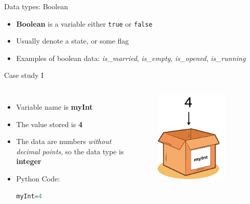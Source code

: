 \documentclass[10pt,xcolor={table,dvipsnames},t]{beamer}
\begin{document}
\begin{frame}{Data types: Boolean}
  \begin{itemize}
    \item \textbf{Boolean} is a variable either \texttt{true} or \texttt{false}
    \item Usually denote a state, or some flag
    \item Examples of boolean data: \textit{is\_married}, \textit{is\_empty}, \textit{is\_opened}, \textit{is\_running}
  \end{itemize}
\end{frame}


\begin{frame}[fragile]{Case study I}
  \begin{columns}
    \begin{itemize}
      \item Variable name is \textbf{myInt}
      \item The value stored is \textbf{4}
      \item The data are numbers \textit{without decimal points}, so the data type is \textbf{integer}
      \item Python Code:\\\begin{lstlisting}[language=python]
    myInt=4\end{lstlisting}
    \end{itemize}
    \begin{figure}
      \includegraphics[width=0.8\textwidth]{img/variable-int.png}
    \end{figure}
  \end{columns}
\end{frame}
\end{document}
